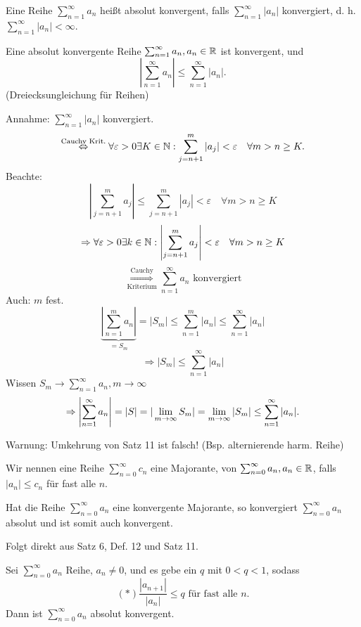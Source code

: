 \begin{defi}
	Eine Reihe \( \sum_{n=1}^{\infty} a_n \) heißt absolut konvergent, falls \( \sum_{n=1}^{\infty}|a_n| \) konvergiert, d. h. \( \sum_{n=1}^{\infty}|a_n|<\infty \).
\end{defi}
\begin{satz}
	Eine absolut konvergente Reihe \( \sum_{n=1}^{\infty}a_n, a_n \in\mathbb{R} \) ist konvergent, und
	\[ \left| \sum_{n=1}^{\infty}a_n \right| \leq \sum_{n=1}^{\infty}|a_n|.\] (Dreiecksungleichung für Reihen)
\end{satz}
\begin{bew}
	Annahme: \( \sum_{n=1}^{\infty} |a_n| \) konvergiert.
	\[ \overset{\text{Cauchy Krit.}}{\Leftrightarrow} \forall \varepsilon>0 \exists K\in\mathbb{N}: \sum_{j=n+1}^{m} |a_j| < \varepsilon\quad\forall m>n\geq K. \]
	Beachte: 
	\[ \left| \sum_{j=n+1}^{m}a_j \right| \leq \sum_{j=n+1}^{m}|a_j| < \varepsilon \quad \forall m>n\geq K \]
	\[\Rightarrow \forall \varepsilon > 0 \exists k \in \mathbb{N}: \left| \sum_{j = n+1}^{m} a_j \right| < \varepsilon \quad \forall m>n\geq K\]
	\[\overset{\text{Cauchy}}{\underset{\text{Kriterium}}{\Rightarrow}} \sum_{n=1}^{\infty} a_n \text{ konvergiert}\]
	Auch: \(m\) fest.
	\[ \underbrace{\left| \sum_{n=1}^{m}a_n \right|}_{=S_m}  = |S_m| \leq \sum_{n=1}^{m}|a_n| \leq \sum_{n=1}^{\infty}|a_n| \]
	\[ \Rightarrow |S_m| \leq \sum_{n=1}^{\infty}|a_n| \]
	Wissen \( S_m\rightarrow \sum_{n=1}^{\infty}a_n, m\rightarrow\infty \)
	\[ \Rightarrow \left|\sum_{n=1}^{\infty}a_n \right| = |S| = |\lim\limits_{m\rightarrow\infty}S_m| = \lim\limits_{m\rightarrow\infty}|S_m| \leq \sum_{n=1}^{\infty}|a_n|. \]
\end{bew}
\begin{bem}
	Warnung: Umkehrung von Satz 11 ist falsch! (Bsp. alternierende harm. Reihe)
\end{bem}
\begin{defi}
	Wir nennen eine Reihe \( \sum_{n=0}^{\infty}c_n \) eine Majorante, von \( \sum_{n=0}^{\infty}a_n, a_n\in\mathbb{R} \), falls \( |a_n| \leq c_n \) für fast alle \(n\).
\end{defi}
\begin{kor}
	Hat die Reihe \( \sum_{n=0}^{\infty}a_n \) eine konvergente Majorante, so konvergiert \( \sum_{n=0}^{\infty}a_n \) absolut und ist somit auch konvergent.
\end{kor}
\begin{bew}
	Folgt direkt aus Satz 6, Def. 12 und Satz 11.
\end{bew}
\begin{satz}[Quotientenkriterium]
	Sei \( \sum_{n=0}^{\infty}a_n \) Reihe, \(a_n\neq0\), und es gebe ein \(q\) mit \(0<q<1\), sodass
	\[(*) \frac{|a_{n+1}|}{|a_n|} \leq q \text{ für fast alle }n. \]
	Dann ist \( \sum_{n=0}^{\infty}a_n \) absolut konvergent.
\end{satz}
